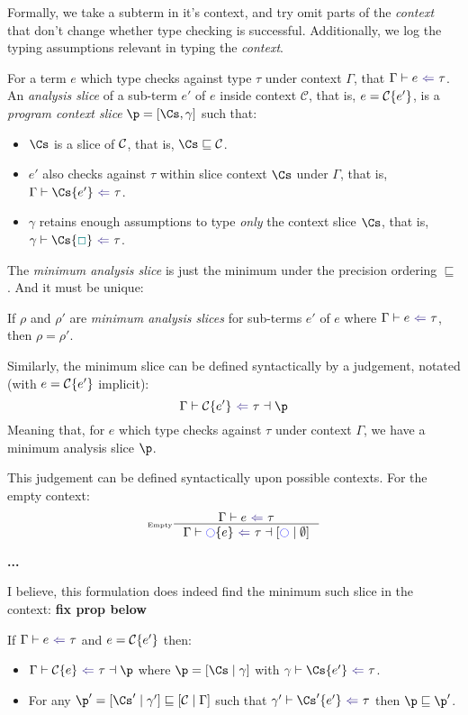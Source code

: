 Formally, we take a subterm in it's context, and try omit parts of the \textit{context} that don't change whether type checking is successful. Additionally, we log the typing assumptions relevant in typing the \textit{context}.

\begin{definition}\label{def:analysisslice}
For a term $e$ which type checks against type $\tau$ under context $\Gamma$, that $\analysis{e}{\tau}$. An \textit{analysis slice} of a sub-term $e'$ of $e$ inside context $\mathcal{C}$, that is, $e = \mathcal{C}\{e'\}$, is a \textit{program context slice} $\p = [\Cs, \gamma]$ such that:
\begin{itemize}
\item $\Cs$ is a slice of $\mathcal{C}$, that is, $\Cs \sqsubseteq \C$.
\item $e'$ also checks against $\tau$ within slice context $\Cs$ under $\Gamma$, that is, $\analysis[\Gamma]{\Cs \{e'\}}{\tau}$.
\item $\gamma$ retains enough assumptions to type \textit{only} the context slice $\Cs$, that is, $\analysis[\gamma]{\Cs\{\gap\}}{\tau}$.
\end{itemize}
\end{definition}

The \textit{minimum analysis slice} is just the minimum under the precision ordering $\sqsubseteq$. And it must be unique:

\begin{conjecture}[Uniqueness]\label{conj:AnalysisSliceUniqueness}
If $\rho$ and $\rho'$ are \textit{minimum analysis slices} for sub-terms $e'$ of $e$ where $\analysis{e}{\tau}$, then $\rho = \rho'$.
\end{conjecture}

Similarly, the minimum slice can be defined syntactically by a judgement, notated (with $e = \mathcal{C}\{e'\}$ implicit):
\[\analysisslice[\Gamma]{\C}{e'}{\tau}{\p}\]
Meaning that, for $e$ which type checks against $\tau$ under context $\Gamma$, we have a minimum analysis slice $\p$.

This judgement can be defined syntactically upon possible contexts. For the empty context:
\[\inference[\tiny Empty]{\analysis{e}{\tau}}{\analysisslice{\mark}{e}{\tau}{[\mark\mid \emptyset]}}\]

\textbf{...}

I believe, this formulation does indeed find the minimum such slice in the context:
\textbf{fix prop below}
\begin{conjecture}[Correctness]\label{conj:AnalysisSliceCorrectness}
If $\analysis{e}{\tau}$ and $e = \mathcal{C}\{e'\}$ then:
\begin{itemize}
\item $\analysisslice{\C}{e}{\tau}{\p}$ where $\p = [\Cs \mid \gamma]$ with $\analysis[\gamma]{\Cs\{e'\}}{\tau}$.
\item For any $\p' = [\Cs' \mid \gamma'] \sqsubseteq [\C\mid \Gamma]$ such that $\analysis[\gamma']{\Cs'\{e'\}}{\tau}$ then $\p \sqsubseteq \p'$.
\end{itemize}
\end{conjecture}

